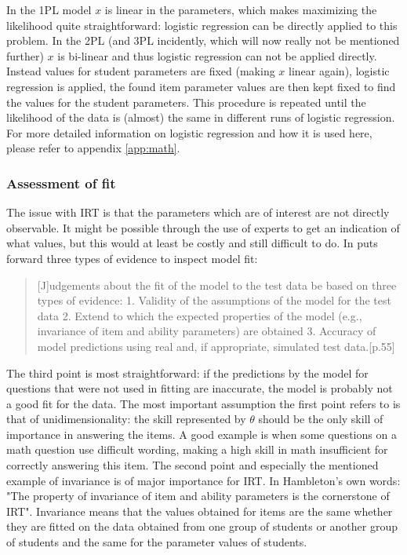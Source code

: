 \documentclass{scrartcl}
\begin{document}
In the 1PL model $x$ is linear in the parameters, which makes maximizing the likelihood quite straightforward: logistic regression can be directly applied to this problem. In the 2PL (and 3PL incidently, which will now really not be mentioned further) $x$ is bi-linear and thus logistic regression can not be applied directly. Instead values for student parameters are fixed (making $x$ linear again), logistic regression is applied, the found item parameter values are then kept fixed to find the values for the student parameters. This procedure is repeated until the likelihood of the data is (almost) the same in different runs of logistic regression. For more detailed information on logistic regression and how it is used here, please refer to appendix \ref{app:math}.

\subsubsection{Assessment of fit}
The issue with IRT is that the parameters which are of interest are not directly observable. It might be possible through the use of experts to get an indication of what values, but this would at least be costly and still difficult to do. In \cite{hambleton} puts forward three types of evidence to inspect model fit:

\begin{quote}[J]udgements about the fit of the model to the test data be based on three types of evidence: 1. Validity of the assumptions of the model for the test data 2. Extend to which the expected properties of the model (e.g., invariance of item and ability parameters) are obtained 3. Accuracy of model predictions using real and, if appropriate, simulated test data.[p.55]
\end{quote}

The third point is most straightforward: if the predictions by the model for questions that were not used in fitting are inaccurate, the model is probably not a good fit for the data. The most important assumption the first point refers to is that of unidimensionality: the skill represented by $\theta$ should be the only skill of importance in answering the items. A good example is when some questions on a math question use difficult wording, making a high skill in math insufficient for correctly answering this item. The second point and especially the mentioned example of invariance is of major importance for IRT. In Hambleton's own words: "The property of invariance of item and ability parameters is the cornerstone of IRT". Invariance means that the values obtained for items are the same whether they are fitted on the data obtained from one group of students or another group of students and the same for the parameter values of students.
\end{document}

